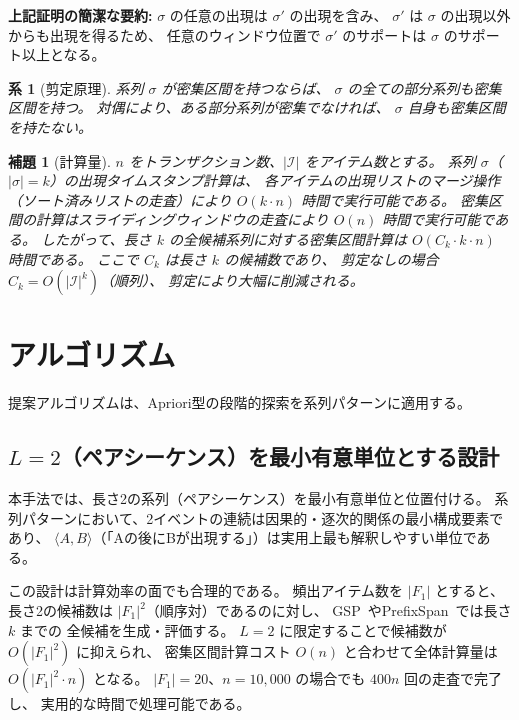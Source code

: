 \documentclass[11pt,a4paper]{article}
\newtheorem{lemma}[theorem]{補題}
\newtheorem{corollary}[theorem]{系}
\begin{document}
\noindent
\textbf{上記証明の簡潔な要約:}
$\sigma$ の任意の出現は $\sigma'$ の出現を含み、
$\sigma'$ は $\sigma$ の出現以外からも出現を得るため、
任意のウィンドウ位置で $\sigma'$ のサポートは $\sigma$ のサポート以上となる。

\begin{corollary}[剪定原理]
\label{cor:pruning}
系列 $\sigma$ が密集区間を持つならば、
$\sigma$ の全ての部分系列も密集区間を持つ。
対偶により、ある部分系列が密集でなければ、
$\sigma$ 自身も密集区間を持たない。
\end{corollary}

\begin{lemma}[計算量]
\label{lem:complexity}
$n$ をトランザクション数、$|\mathcal{I}|$ をアイテム数とする。
系列 $\sigma$（$|\sigma| = k$）の出現タイムスタンプ計算は、
各アイテムの出現リストのマージ操作（ソート済みリストの走査）により
$O(k \cdot n)$ 時間で実行可能である。
密集区間の計算はスライディングウィンドウの走査により
$O(n)$ 時間で実行可能である。
したがって、長さ $k$ の全候補系列に対する密集区間計算は
$O(C_k \cdot k \cdot n)$ 時間である。
ここで $C_k$ は長さ $k$ の候補数であり、
剪定なしの場合 $C_k = O(|\mathcal{I}|^k)$（順列）、
剪定により大幅に削減される。
\end{lemma}

\section{アルゴリズム}
\label{sec:algorithm}

提案アルゴリズムは、Apriori型の段階的探索を系列パターンに適用する。

\subsection{$L=2$（ペアシーケンス）を最小有意単位とする設計}

本手法では、長さ2の系列（ペアシーケンス）を最小有意単位と位置付ける。
系列パターンにおいて、2イベントの連続は因果的・逐次的関係の最小構成要素であり、
$\langle A, B \rangle$（「Aの後にBが出現する」）は実用上最も解釈しやすい単位である。

この設計は計算効率の面でも合理的である。
頻出アイテム数を $|F_1|$ とすると、長さ2の候補数は $|F_1|^2$（順序対）であるのに対し、
GSP~\cite{Agrawal1995}やPrefixSpan~\cite{Pei2001}では長さ $k$ までの
全候補を生成・評価する。
$L=2$ に限定することで候補数が $O(|F_1|^2)$ に抑えられ、
密集区間計算コスト $O(n)$ と合わせて全体計算量は $O(|F_1|^2 \cdot n)$ となる。
$|F_1| = 20$、$n = 10{,}000$ の場合でも $400n$ 回の走査で完了し、
実用的な時間で処理可能である。
\end{document}
